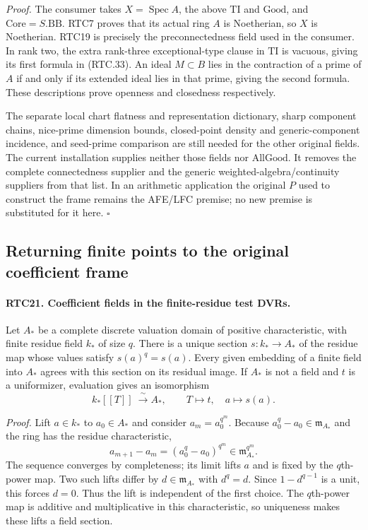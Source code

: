 \documentclass[11pt,a4paper]{article}
\numberwithin{equation}{section}
\theoremstyle{remark}\newtheorem{remark}[theorem]{Remark}
\begin{document}
\emph{Proof.}
The consumer takes \(X=\operatorname{Spec}A\), the above
\(\mathrm{TI}\) and \(\mathrm{Good}\), and
\(\mathrm{Core}=S.\mathrm{BB}\).  RTC7 proves that its actual
ring \(A\) is Noetherian, so \(X\) is Noetherian.  RTC19
is precisely the preconnectedness field used in the consumer.
In rank two, the extra rank-three exceptional-type clause in
\(\mathrm{TI}\) is vacuous, giving its first formula in
(RTC.33).  An ideal \(M\subset B\) lies in the contraction
of a prime of \(A\) if and only if its extended ideal lies
in that prime, giving the second formula.  These descriptions
prove openness and closedness respectively.

The separate local chart flatness and representation dictionary,
sharp component chains, nice-prime dimension bounds, closed-point
density and generic-component incidence, and seed-prime comparison
are still needed for the other original fields.  The current
installation supplies neither those fields nor \(\mathrm{AllGood}\).
It removes the complete connectedness supplier and the generic
weighted-algebra/continuity suppliers from that list.  In an
arithmetic application the original \(P\) used to construct the
frame remains the AFE/LFC premise; no new premise is substituted
for it here. \hfill\(\square\)

\subsection{Returning finite points to the original coefficient frame}

\paragraph{RTC21. Coefficient fields in the finite-residue test DVRs.}
\label{claim:RTC21}
Let \(A_*\) be a complete discrete valuation domain of positive
characteristic, with finite residue field \(k_*\) of size \(q\).
There is a unique section \(s:k_*\to A_*\) of the residue map
whose values satisfy \(s(a)^q=s(a)\).  Every given embedding
of a finite field into \(A_*\) agrees with this section on its
residual image.  If \(A_*\) is not a field and \(t\) is a
uniformizer, evaluation gives an isomorphism
\[
 k_*[[T]]\ \xrightarrow{\ \sim\ } A_*,
       \qquad T\longmapsto t,\quad a\longmapsto s(a).
                                                        \tag{RTC.34}
\]

\emph{Proof.}
Lift \(a\in k_*\) to \(a_0\in A_*\) and consider
\(a_m=a_0^{q^m}\).  Because \(a_0^q-a_0\in\mathfrak m_{A_*}\)
and the ring has the residue characteristic,
\[
 a_{m+1}-a_m=(a_0^q-a_0)^{q^m}
       \in\mathfrak m_{A_*}^{q^m}.
\]
The sequence converges by completeness; its limit lifts \(a\)
and is fixed by the \(q\)th-power map.  Two such lifts differ
by \(d\in\mathfrak m_{A_*}\) with \(d^q=d\).  Since
\(1-d^{q-1}\) is a unit, this forces \(d=0\).  Thus the
lift is independent of the first choice.  The \(q\)th-power
map is additive and multiplicative in this characteristic, so
uniqueness makes these lifts a field section.
\end{document}
